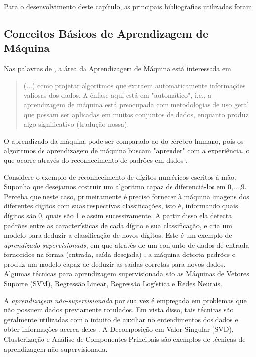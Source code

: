 \documentclass[12pt,a4paper]{scrartcl}
\theoremstyle{definition}%
\begin{document}
Para o desenvolvimento deste capítulo, as principais bibliografias utilizadas foram \textcite{Faisal2019,Evelin2017}


\subsection{Conceitos Básicos de Aprendizagem de Máquina}

Nas palavras de \textcite[p. 11]{Faisal2019}, a área da Aprendizagem de Máquina está interessada em 
\begin{quote}
(...) como projetar algoritmos que extraem automaticamente informações valiosas dos dados. A ênfase aqui está em "automático", i.e., a aprendizagem de máquina está preocupada com metodologias de uso geral que possam ser aplicadas em muitos conjuntos de dados, enquanto produz algo significativo (tradução nossa). 
\end{quote}
O aprendizado da máquina pode ser comparado ao do cérebro humano, pois os algoritmos de aprendizagem de máquina buscam "aprender" com a experiência, o que ocorre através do reconhecimento de padrões em dados \cite{Evelin2017}. 

Considere o exemplo de reconhecimento de dígitos numéricos escritos à mão. Suponha que desejamos costruir um algoritmo capaz de diferenciá-los em 0,...,9. Perceba que neste caso, primeiramente é preciso fornecer à máquina imagens dos diferentes dígitos com suas respectivas classificações, isto é, informando quais dígitos são 0, quais são 1 e assim sucessivamente. A partir disso ela detecta padrões entre as características de cada dígito e sua classificação, e cria um modelo para deduzir a classificação de novos dígitos. Este é um exemplo de \emph{aprendizado supervisionado}, em que através de um conjunto de dados de entrada fornecidos na forma (entrada, saída desejada) \cite{Lorena&Carvalho}, a máquina detecta padrões e produz um modelo capaz de deduzir as saídas corretas para novos dados. Algumas técnicas para aprendizagem supervisionada são as Máquinas de Vetores Suporte (SVM), Regressão Linear, Regressão Logística e Redes Neurais.

A \emph{aprendizagem não-supervisionada} por sua vez é empregada em problemas que não possuem dados previamente rotulados. Em vista disso, tais técnicas são geralmente utilizadas com o intuito de auxiliar no entendimentos dos dados e obter informações acerca deles \cite{Lorena&Carvalho}. A Decomposição em Valor Singular (SVD), Clusterização e Análise de Componentes Principais \cite{Evelin2017} são exemplos de técnicas de aprendizagem não-supervisionada. 
\end{document}
